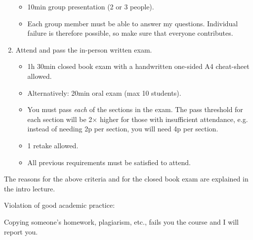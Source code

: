 \documentclass[usegeometry,parskip=half]{scrartcl}
\begin{document}
\begin{enumerate}
\begin{itemize}
    \item 10min group presentation (2 or 3 people).
    \item Each group member must be able to answer my questions.
    Individual failure is therefore possible, so make sure that everyone contributes.
  \end{itemize}
  \item Attend and pass the in-person written exam.
  \begin{itemize}
    \item 1h 30min closed book exam with a handwritten one-sided A4 cheat-sheet allowed.
    \item Alternatively: 20min oral exam (max 10 students).
    \item You must pass \emph{each} of the sections in the exam.
    The pass threshold for each section will be 2$\times$ higher for those with insufficient attendance, e.g. instead of needing 2p per section, you will need 4p per section.
    \item 1 retake allowed.
    \item All previous requirements must be satisfied to attend.
  \end{itemize}
\end{enumerate}

The reasons for the above criteria and for the closed book exam are explained in the intro lecture.

\vspace*{\parskip}

Violation of good academic practice:

Copying someone's homework, plagiarism, etc.\footnotemark{}, fails you the course and I will report you.

\end{document}
